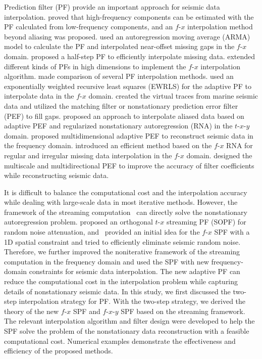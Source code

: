 Prediction filter (PF) provide an important approach for seismic data
interpolation. \citet{Spitz91} proved that high-frequency components
can be estimated with the PF calculated from low-frequency components,
and an $f$-$x$ interpolation method beyond aliasing was proposed.
\citet{Sacchi97} used an autoregression moving average (ARMA) model to
calculate the PF and interpolated near-offset missing gaps in the
$f$-$x$ domain. \citet{Porsani99} proposed a half-step PF to
efficiently interpolate missing data. \citet{Wang02} extended
different kinds of PFs in high dimensions to implement the $f$-$x$
interpolation algorithm. \citet{Abma05} made comparison of several PF
interpolation methods. \citet{Naghizadeh09} used an exponentially
weighted recursive least squares (EWRLS) for the adaptive PF to
interpolate data in the $f$-$x$ domain. \citet{Wangy10} created the
virtual traces from marine seismic data and utilized the matching
filter or nonstationary prediction error filter (PEF) to fill gaps.
\citet{Liu11} proposed an approach to interpolate aliased data based
on adaptive PEF and regularized nonstationary autoregression (RNA) in
the $t$-$x$-$y$ domain. \citet{Li17} proposed multidimensional
adaptive PEF to reconstruct seismic data in the frequency domain.
\citet{Liug18} introduced an efficient method based on the $f$-$x$ RNA
for regular and irregular missing data interpolation in the $f$-$x$
domain. \citet{Liu19} designed the multiscale and multidirectional
PEF to improve the accuracy of filter coefficients while
reconstructing seismic data.

It is difficult to balance the computational cost and the
interpolation accuracy while dealing with large-scale data in most
iterative methods. However, the framework of the streaming
computation~\citep{Sacchi09, Fomel16} can directly solve the
nonstationary autoregression problem. \citet{Liuy18} proposed an
orthogonal $t$-$x$ streaming PF (SOPF) for random noise attenuation,
and~\citet{Guo20} provided an initial idea for the $f$-$x$ SPF with a
1D spatial constraint and tried to efficiently eliminate seismic
random noise. Therefore, we further improved the noniterative
framework of the streaming computation in the frequency domain and
used the SPF with new frequency-domain constraints for seismic data
interpolation. The new adaptive PF can reduce the computational cost
in the interpolation problem while capturing details of nonstationary
seismic data.  In this study, we first discussed the two-step
interpolation strategy for PF. With the two-step strategy, we derived
the theory of the new $f$-$x$ SPF and $f$-$x$-$y$ SPF based on the
streaming framework.  The relevant interpolation algorithm and filter
design were developed to help the SPF solve the problem of the
nonstationary data reconstruction with a feasible computational
cost. Numerical examples demonstrate the effectiveness and efficiency
of the proposed methods.

